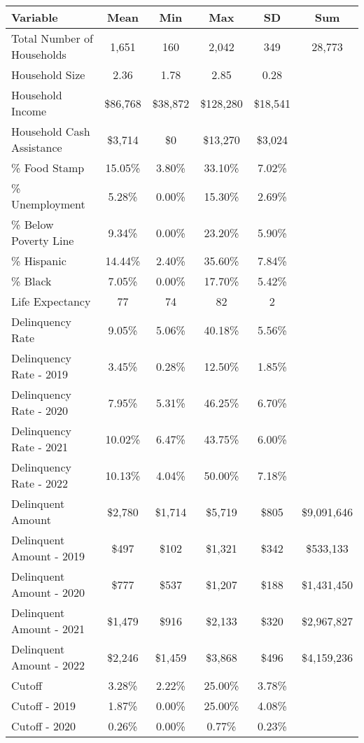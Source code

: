 \begin{tabular}{l|c|c|c|c|c}
\toprule 
\midrule 
Variable & Mean & Min & Max & SD & Sum \\
\midrule 
Total Number of Households & 1,651 & 160 & 2,042 & 349 & 28,773 \\
\quad Household Size & 2.36 & 1.78 & 2.85 & 0.28 \\
Household Income & \$86,768 & \$38,872 & \$128,280 & \$18,541 \\
\quad Household Cash Assistance & \$3,714 & \$0 & \$13,270 & \$3,024 \\
\% Food Stamp & 15.05\% & 3.80\% & 33.10\% & 7.02\% \\
\% Unemployment & 5.28\% & 0.00\% & 15.30\% & 2.69\% \\
\% Below Poverty Line & 9.34\% & 0.00\% & 23.20\% & 5.90\% \\
\% Hispanic & 14.44\% & 2.40\% & 35.60\% & 7.84\% \\
\% Black & 7.05\% & 0.00\% & 17.70\% & 5.42\% \\
Life Expectancy & 77 & 74 & 82 & 2 \\
\midrule 
Delinquency Rate & 9.05\% & 5.06\% & 40.18\% & 5.56\% \\
\quad Delinquency Rate - 2019 & 3.45\% & 0.28\% & 12.50\% & 1.85\% \\
\quad Delinquency Rate - 2020 & 7.95\% & 5.31\% & 46.25\% & 6.70\% \\
\quad Delinquency Rate - 2021 & 10.02\% & 6.47\% & 43.75\% & 6.00\% \\
\quad Delinquency Rate - 2022 & 10.13\% & 4.04\% & 50.00\% & 7.18\% \\
\midrule 
Delinquent Amount & \$2,780 & \$1,714 & \$5,719 & \$805 & \$9,091,646 \\
\quad Delinquent Amount - 2019 & \$497 & \$102 & \$1,321 & \$342 & \$533,133 \\
\quad Delinquent Amount - 2020 & \$777 & \$537 & \$1,207 & \$188 & \$1,431,450 \\
\quad Delinquent Amount - 2021 & \$1,479 & \$916 & \$2,133 & \$320 & \$2,967,827 \\
\quad Delinquent Amount - 2022 & \$2,246 & \$1,459 & \$3,868 & \$496 & \$4,159,236 \\
\midrule 
Cutoff & 3.28\% & 2.22\% & 25.00\% & 3.78\% \\
\quad Cutoff - 2019 & 1.87\% & 0.00\% & 25.00\% & 4.08\% \\
\quad Cutoff - 2020 & 0.26\% & 0.00\% & 0.77\% & 0.23\% \\

\end{tabular}
